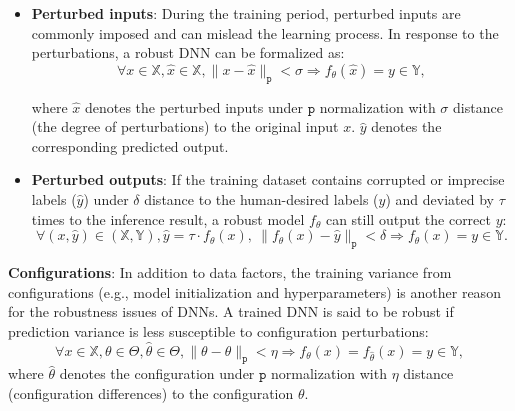 \begin{itemize}[leftmargin=.2in] 

    \item \textbf{Perturbed inputs}: During the training period, perturbed inputs are commonly imposed and can mislead the learning process. In response to the perturbations, a robust DNN can be formalized as:
    \begin{equation}\label{eq1}
    \forall x\in \mathbb{X}, \hat{x}\in \mathbb{X}, \|x-\hat{x}\|_\mathtt{p} < \sigma \Rightarrow {f_{\theta}(\hat{x})}=y\in \mathbb{Y},
    \end{equation}

where $\hat{x}$ denotes the perturbed inputs under $\mathtt{p}$ normalization with $\sigma$ distance (the degree of perturbations) to the original input $x$. $\hat{y}$ denotes the corresponding predicted output. 


    \item \textbf{Perturbed outputs}: If the training dataset contains corrupted or imprecise labels ($\hat{y}$) under $\delta$ distance to the human-desired labels ($y$) and deviated by $\tau$ times to the inference result, a robust model $f_{\theta}$ can still output the correct $y$:
    \begin{equation} \label{eq3} 
    \forall (x, \hat{y})\in( \mathbb{X}, \mathbb{Y}), \hat{y} = \tau \cdot f_{\theta}(x), \  \|f_{\theta}(x)-\hat{y}\|_\mathtt{p} < \delta  \Rightarrow f_{\theta}(x) = y\in \mathbb{Y}.
    \end{equation}
\end{itemize}

\item{\textbf{Configurations}:} In addition to data factors, the training variance from configurations (e.g., model initialization and hyperparameters) is another reason for the robustness issues of DNNs. A trained DNN is said to be robust if prediction variance is less susceptible to configuration perturbations:
    \begin{equation}\label{eq4}  
   \forall  x\in \mathbb{X}, \theta \in \Theta, \hat{\theta} \in \Theta, \|\theta-\hat{\theta}\|_\mathtt{p} < \eta \Rightarrow f_{\theta}(x)=f_{\hat{\theta}}(x)=y\in \mathbb{Y},
    \end{equation}
where $\hat{\theta}$ denotes the configuration under $\mathtt{p}$ normalization with $\eta$ distance (configuration differences) to the configuration $\theta$.


